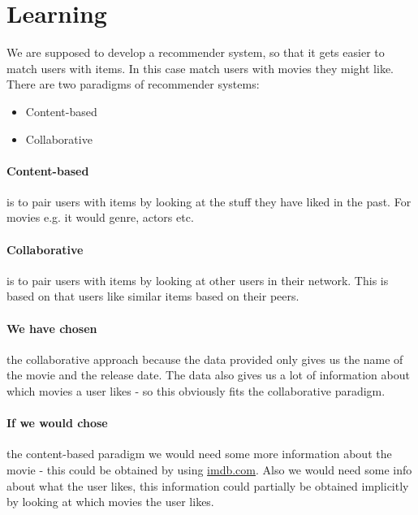 \section{Learning}
We are supposed to develop a recommender system, so that it gets easier to match users with items.
In this case match users with movies they might like.
There are two paradigms of recommender systems:
\begin{itemize}
\item Content-based
\item Collaborative
\end{itemize}
\paragraph{Content-based} is to pair users with items by looking at the stuff they have liked in the past.
For movies e.g. it would genre, actors etc.

\paragraph{Collaborative} is to pair users with items by looking at other users in their network.
This is based on that users like similar items based on their peers.

\paragraph{We have chosen} the collaborative approach because the data provided only gives us the name of the movie and the release date.
The data also gives us a lot of information about which movies a user likes - so this obviously fits the collaborative paradigm.

\paragraph{If we would chose} the content-based paradigm we would need some more information about the movie - this could be obtained by using \url{imdb.com}.
Also we would need some info about what the user likes, this information could partially be obtained implicitly by looking at which movies the user likes.